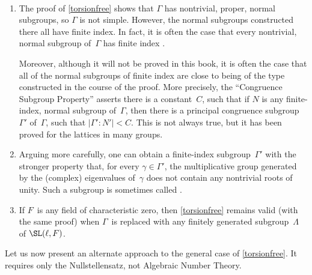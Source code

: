  \begin{rems} \ \label{SelbergRems}
 \noprelistbreak
	 \begin{enumerate}
	
	\item The proof of \cref{torsionfree} shows that $\Gamma$
	has nontrivial, proper, normal subgroups, so $\Gamma$ is
	not simple. However, the normal subgroups
	constructed there all have finite index. In fact, it is often the case that every nontrivial, normal
	subgroup of~$\Gamma$ has finite index
	. 
	
	Moreover, although it will not be proved in this book,
	it is often the case that all of the normal
	subgroups of finite index are close to being of the type
	constructed in the course of the proof. 
	More precisely, the
	``Congruence Subgroup Property''
	asserts there is a constant~$C$, such that if $N$ is any finite-index, normal subgroup of~$\Gamma$, then there is a principal congruence subgroup~$\Gamma'$ of~$\Gamma$, such that $|\Gamma' : N'| < C$. This is not always true, but it has been proved for the lattices in many groups.
	
	 \item \label{SelbergRems-net}
	 Arguing more carefully, one can obtain a
	finite-index subgroup~$\Gamma'$ with the stronger property
	that, for every $\gamma \in \Gamma'$, the multiplicative
	group generated by the (complex) eigenvalues of~$\gamma$
	does not contain any nontrivial roots of unity. Such a
	subgroup is sometimes called .
	
	 \item \label{SelbergRems-F}
	 If $F$~is any field of characteristic zero, then \cref{torsionfree} remains valid (with the same proof) when $\Gamma$~is replaced with any finitely generated subgroup~$\Lambda$ of $\SL(\ell,F)$.
	  \end{enumerate}
 \end{rems}


Let us now present an alternate approach to the general
case of \cref{torsionfree}. It requires only the
Nullstellensatz, not Algebraic Number Theory.


